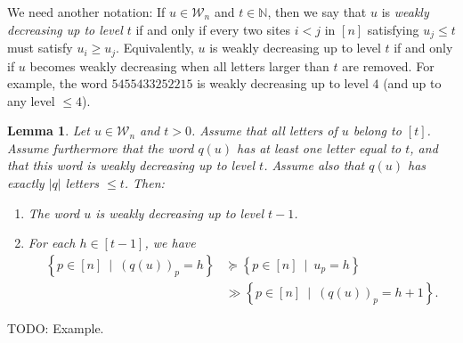 \documentclass[reqno]{amsart}
\newcommand{\0}{\phantom{c}}
\newcommand{\defn}[1]{{\color{darkred}\emph{#1}}} %
\theoremstyle{plain}
\newtheorem{lemma}[thm]{Lemma}
\theoremstyle{definition}
\numberwithin{equation}{section}
\begin{document}
We need another notation: If $u\in\mathcal{W}_{n}$ and $t\in\mathbb{N}$, then
we say that $u$ is \defn{weakly decreasing up to level $t$} if and only if
every two sites $i<j$ in $\left[  n\right]  $ satisfying $u_{j}\leq t$ must
satisfy $u_{i}\geq u_{j}$. Equivalently, $u$ is weakly decreasing up to level
$t$ if and only if $u$ becomes weakly decreasing when all letters larger than
$t$ are removed. For example, the word $5455433252215$ is weakly decreasing up
to level $4$ (and up to any level $\leq4$).

\begin{lemma}
\label{lem:determinant_form.interl-A}Let $u\in\mathcal{W}_{n}$ and $t>0$.
Assume that all letters of $u$ belong to $\left[  t\right]  $. Assume
furthermore that the word $q\left(  u\right)  $ has at least one letter equal
to $t$, and that this word is weakly decreasing up to level $t$. Assume also
that $q\left(  u\right)  $ has exactly $\left\vert q\right\vert $ letters
$\leq t$. Then:

\begin{enumerate}
\item[(a)] The word $u$ is weakly decreasing up to level $t-1$.

\item[(b)] For each $h\in\left[  t-1\right]  $, we have%
\begin{align*}
\left\{  p\in\left[  n\right]  \ \mid\ \left(  q\left(  u\right)  \right)
_{p}=h\right\}    & \succeq\left\{  p\in\left[  n\right]  \ \mid
\ u_{p}=h\right\}  \\
& \gg\left\{  p\in\left[  n\right]  \ \mid\ \left(  q\left(  u\right)
\right)  _{p}=h+1\right\}  .
\end{align*}

\end{enumerate}
\end{lemma}

TODO: Example.
\end{document}
